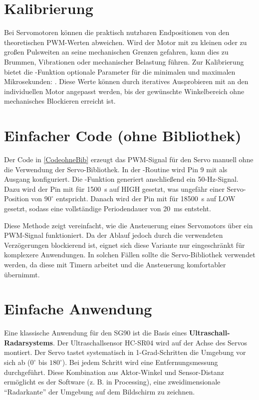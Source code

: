 \section{Kalibrierung}
Bei Servomotoren können die praktisch nutzbaren Endpositionen von den theoretischen PWM-Werten abweichen. Wird der Motor mit zu kleinen oder zu gro\ss en Pulsweiten an seine mechanischen Grenzen gefahren, kann dies zu Brummen, Vibrationen oder mechanischer Belastung führen\cite{ArduinoWriteMic:2026}. Zur Kalibrierung bietet die -Funktion optionale Parameter für die minimalen und maximalen Mikrosekunden: . Diese Werte können durch iteratives Ausprobieren mit  an den individuellen Motor angepasst werden, bis der gewünschte Winkelbereich ohne mechanisches Blockieren erreicht ist.

\section{Einfacher Code (ohne Bibliothek)}
Der Code in \ref{CodeohneBib} erzeugt das PWM-Signal für den Servo manuell ohne die Verwendung der Servo-Bibliothek. In der -Routine wird Pin 9 mit  als Ausgang konfiguriert. Die -Funktion generiert anschlie\ss end ein 50-Hz-Signal. Dazu wird der Pin mit  für 1500~\textmu s auf HIGH gesetzt, was ungefähr einer Servo-Position von $90^\circ$ entspricht. Danach wird der Pin mit  für 18500~\textmu s auf LOW gesetzt, sodass eine vollständige Periodendauer von 20~ms entsteht.

Diese Methode zeigt vereinfacht, wie die Ansteuerung eines Servomotors über ein PWM-Signal funktioniert. Da der Ablauf jedoch durch die verwendeten Verzögerungen blockierend ist, eignet sich diese Variante nur eingeschränkt für komplexere Anwendungen. In solchen Fällen sollte die Servo-Bibliothek verwendet werden, da diese mit Timern arbeitet und die Ansteuerung komfortabler übernimmt.

\begin{center}
	 \label{CodeohneBib} 
\end{center}

\section{Einfache Anwendung}
Eine klassische Anwendung für den SG90 ist die Basis eines \textbf{Ultraschall-Radarsystems}. Der Ultraschallsensor HC-SR04 wird auf der Achse des Servos montiert. Der Servo tastet systematisch in 1-Grad-Schritten die Umgebung vor sich ab ($0^\circ$ bis $180^\circ$). Bei jedem Schritt wird eine Entfernungsmessung durchgeführt. Diese Kombination aus Aktor-Winkel und Sensor-Distanz ermöglicht es der Software (z. B. in Processing), eine zweidimensionale "`Radarkante"' der Umgebung auf dem Bildschirm zu zeichnen.\cite{ArduinoProjectHubRadar:2025}

